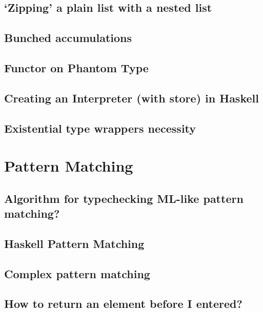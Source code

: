 \documentclass{book}
\begin{document}
\section{`Zipping' a plain list with a nested list}


\section{Bunched accumulations}


\section{Functor on Phantom Type}


\section{Creating an Interpreter (with store) in Haskell}


\section{Existential type wrappers necessity}



\chapter{Pattern Matching}

\section{Algorithm for typechecking ML-like pattern matching?}


\section{Haskell Pattern Matching}


\section{Complex pattern matching}


\section{How to return an element before I entered?}

\end{document}
